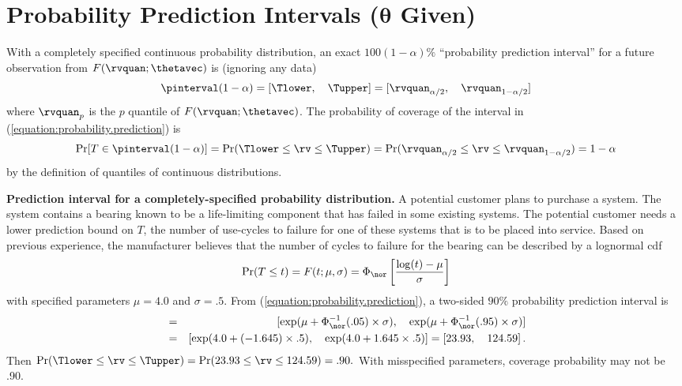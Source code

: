 \section{Probability Prediction Intervals ($\boldsymbol{\theta} $ Given)}
\label{section:prob.pred}
With a completely specified continuous probability distribution, an exact
$100(1-\alpha)\%$ ``probability prediction interval'' for a future 
observation from $F(\rvquan;\thetavec)$ is (ignoring any
data)
\begin{equation}
\label{equation:probability.prediction}
	\pinterval(1-\alpha)=[ \Tlower,\quad \Tupper ] =
[\rvquan_{\alpha/2}, \quad \rvquan_{1-\alpha/2}]
\end{equation}
where $\rvquan_{p}$ is the $p$ quantile of
$F(\rvquan;\thetavec)$. The probability of coverage of the interval in
(\ref{equation:probability.prediction}) is
\begin{displaymath}
\Pr[T \in \pinterval(1-\alpha)] = 
	\Pr(\Tlower \leq \rv \leq \Tupper)=
	\Pr(\rvquan_{\alpha/2} \leq \rv \leq \rvquan_{1-\alpha/2})=
	1-\alpha
\end{displaymath}
by the definition of quantiles of continuous distributions.

\begin{example}
\label{example:spec.dist.pi}
{\bf Prediction interval for a completely-specified probability
distribution.} A potential customer plans to purchase a system. The
system contains a bearing known to be a life-limiting component that
has failed in some existing systems.  The potential customer needs a
lower prediction bound on $T$, the number of use-cycles to failure
for one of these systems that is to be placed into service.  Based
on previous experience, the manufacturer believes that the number of
cycles to failure for the bearing can be described by a lognormal
cdf
\begin{displaymath}
	\Pr(T \leq t) = F(t;\mu,\sigma) = \Phi_{\nor}
\left[\frac{\log(t) - \mu}{\sigma}\right]
\end{displaymath}
with specified parameters $\mu=4.0$ and $\sigma=.5$.  From
(\ref{equation:probability.prediction}), a two-sided $90\%$
probability prediction interval is
\begin{eqnarray*}
	[ \Tlower, \quad \Tupper ] &=& [ \exp(\mu + \Phi_{\nor}^{-1}(.05)
\times \sigma), \quad
\exp(\mu + \Phi_{\nor}^{-1}(.95) \times \sigma)] \\
&=& \left [ \exp(4.0 + (-1.645) \times .5), \quad \exp(4.0 + 1.645 \times .5)
\right ]= \left [23.93, \quad 124.59  \right].
\end{eqnarray*}
Then $\Pr(\Tlower \leq \rv \leq \Tupper)= \Pr( 23.93 \leq \rv
\leq 124.59 ) = .90.$ With misspecified parameters, coverage
probability may not be .90.
\end{example}

